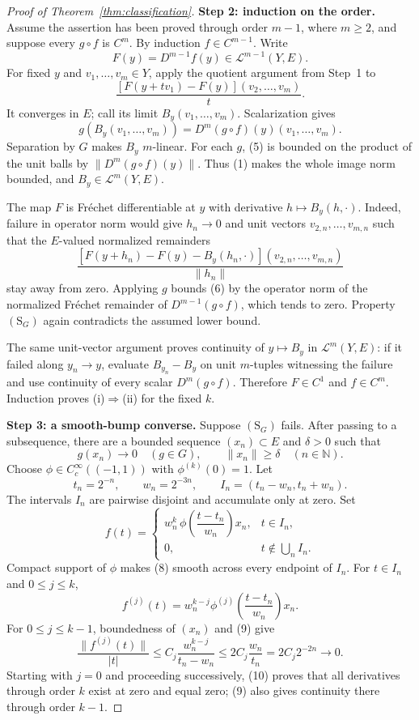 \documentclass[11pt]{article}
\newcommand{\N}{\mathbb N}
\newcommand{\Lop}{\mathcal L}
\newcommand{\SG}{(\mathrm{S}_G)}
\begin{document}
\begin{proof}[Proof of Theorem~\ref{thm:classification}]
\medskip
\noindent\textbf{Step 2: induction on the order.}
Assume the assertion has been proved through order $m-1$, where $m\geq2$,
and suppose every $g\circ f$ is $C^m$.  By induction $f\in C^{m-1}$.
Write
\[
 F(y)=D^{m-1}f(y)\in\Lop^{m-1}(Y,E).
\]
For fixed $y$ and $v_1,\ldots,v_m\in Y$, apply the quotient argument from
Step~1 to
\[
 \frac{[F(y+tv_1)-F(y)](v_2,\ldots,v_m)}{t}.
\]
It converges in $E$; call its limit
$B_y(v_1,\ldots,v_m)$.  Scalarization gives
\[
 g(B_y(v_1,\ldots,v_m))
   =D^m(g\circ f)(y)(v_1,\ldots,v_m).
 \tag{5}
\]
Separation by $G$ makes $B_y$ $m$-linear.  For each $g$, (5) is bounded on
the product of the unit balls by $\|D^m(g\circ f)(y)\|$.  Thus (1) makes the
whole image norm bounded, and $B_y\in\Lop^m(Y,E)$.

The map $F$ is Fr\'echet differentiable at $y$ with derivative
$h\mapsto B_y(h,\cdot)$.  Indeed, failure in operator norm would give
$h_n\to0$ and unit vectors $v_{2,n},\ldots,v_{m,n}$ such that the $E$-valued
normalized remainders
\[
 \frac{[F(y+h_n)-F(y)-B_y(h_n,\cdot)]
 (v_{2,n},\ldots,v_{m,n})}{\|h_n\|}
 \tag{6}
\]
stay away from zero.  Applying $g$ bounds (6) by the operator norm of the
normalized Fr\'echet remainder of $D^{m-1}(g\circ f)$, which tends to zero.
Property $\SG$ again contradicts the assumed lower bound.

The same unit-vector argument proves continuity of $y\mapsto B_y$ in
$\Lop^m(Y,E)$: if it failed along $y_n\to y$, evaluate
$B_{y_n}-B_y$ on unit $m$-tuples witnessing the failure and use continuity
of every scalar $D^m(g\circ f)$.  Therefore $F\in C^1$ and
$f\in C^m$.  Induction proves (i)$\Rightarrow$(ii) for the fixed $k$.

\medskip
\noindent\textbf{Step 3: a smooth-bump converse.}
Suppose $\SG$ fails.  After passing to a subsequence, there are a bounded
sequence $(x_n)\subset E$ and $\delta>0$ such that
\[
 g(x_n)\longrightarrow0\quad(g\in G),
 \qquad \|x_n\|\geq\delta\quad(n\in\N).
 \tag{7}
\]
Choose $\phi\in C_c^\infty((-1,1))$ with $\phi^{(k)}(0)=1$.  Let
\[
 t_n=2^{-n},\qquad w_n=2^{-3n},\qquad
 I_n=(t_n-w_n,t_n+w_n).
\]
The intervals $I_n$ are pairwise disjoint and accumulate only at zero.  Set
\[
 f(t)=
 \begin{cases}
  w_n^k\,\phi\!\left(\dfrac{t-t_n}{w_n}\right)x_n,&t\in I_n,\\[6pt]
  0,&t\notin\bigcup_n I_n.
 \end{cases}
 \tag{8}
\]
Compact support of $\phi$ makes (8) smooth across every endpoint of $I_n$.
For $t\in I_n$ and $0\leq j\leq k$,
\[
 f^{(j)}(t)=w_n^{k-j}
 \phi^{(j)}\!\left(\frac{t-t_n}{w_n}\right)x_n.
 \tag{9}
\]
For $0\leq j\leq k-1$, boundedness of $(x_n)$ and (9) give
\[
 \frac{\|f^{(j)}(t)\|}{|t|}
 \leq C_j\frac{w_n^{k-j}}{t_n-w_n}
 \leq 2C_j\frac{w_n}{t_n}
 =2C_j2^{-2n}\longrightarrow0.
 \tag{10}
\]
Starting with $j=0$ and proceeding successively, (10) proves that all
derivatives through order $k$ exist at zero and equal zero; (9) also gives
continuity there through order $k-1$.


\end{proof}
\end{document}
